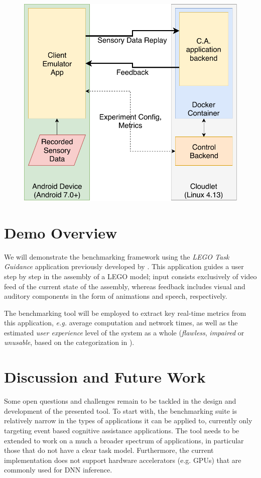 \begin{figure}
  \centering
  \includegraphics[width=.7\columnwidth]{publications/2018DemoScalingOnTheEdge/img/TraceReplay_GenArch}
  \label{fig:TraceReplayArch}
\end{figure}

\section{Demo Overview}

We will demonstrate the benchmarking framework using the \emph{LEGO Task Guidance} application previously developed by \textcite{Chen2015Early}.
This application guides a user step by step in the assembly of a LEGO model; input consists exclusively of video feed of the current state of the assembly, whereas feedback includes visual and auditory components in the form of animations and speech, respectively.

The benchmarking tool will be employed to extract key real-time metrics from this application, \emph{e.g.} average computation and network times, as well as the estimated \emph{user experience} level of the system as a whole (\emph{flawless}, \emph{impaired} or \emph{unusable}, based on the categorization in \cite{Chen2017Empirical}).

\section{Discussion and Future Work}

Some open questions and challenges remain to be tackled in the design and development of the presented tool.
To start with, the benchmarking suite is relatively narrow in the types of applications it can be applied to, currently only targeting event based cognitive assistance applications.
The tool needs to be extended to work on a much a broader spectrum of applications, in particular those that do not have a clear task model.
Furthermore, the current implementation does not support hardware accelerators (e.g. \glspl{GPU}) that are commonly used for \gls{DNN} inference.

